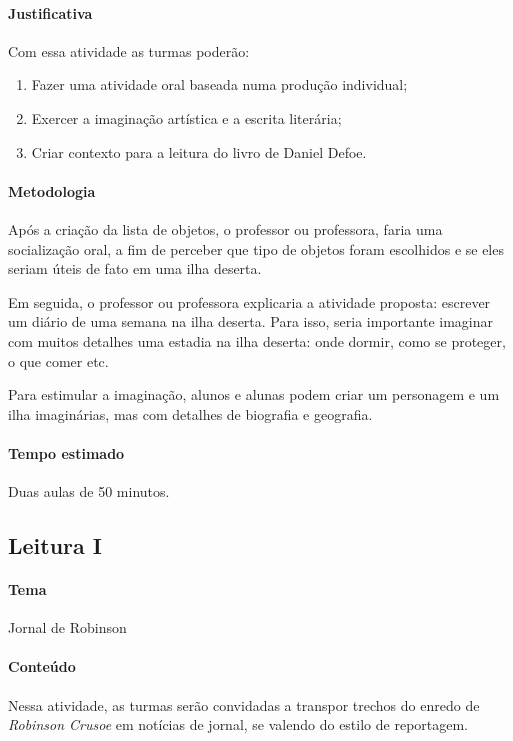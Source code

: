 \documentclass{article}
\begin{document}
\paragraph{Justificativa}
Com essa atividade as turmas poderão:

\begin{enumerate}
\item
Fazer uma atividade oral baseada numa produção individual; 

\item
Exercer a imaginação artística e a escrita literária;

\item
Criar contexto para a leitura do livro de Daniel Defoe.
\end{enumerate}

\paragraph{Metodologia}
Após a criação da lista de objetos, o professor ou professora, faria uma
socialização oral, a fim de perceber que tipo de objetos foram
escolhidos e se eles seriam úteis de fato em uma ilha deserta.

Em seguida, o professor ou professora explicaria a atividade proposta:
escrever um diário de uma semana na ilha deserta. Para isso, seria
importante imaginar com muitos detalhes uma estadia na ilha deserta:
onde dormir, como se proteger, o que comer etc.

Para estimular a imaginação, alunos e alunas podem criar um personagem e
um ilha imaginárias, mas com detalhes de biografia e geografia.

\paragraph{Tempo estimado} Duas aulas de 50 minutos.

\subsection{Leitura I}

\paragraph{Tema} Jornal de Robinson


\paragraph{Conteúdo} Nessa atividade, as turmas serão convidadas a transpor trechos do enredo de \emph{Robinson Crusoe} em notícias de jornal, se valendo do estilo de
reportagem.
\end{document}
